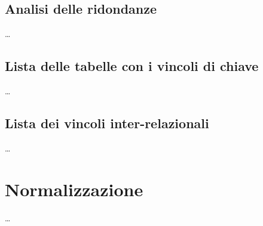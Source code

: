 \documentclass{article}
\begin{document}
\subsection{Analisi delle ridondanze}
\large
\dots

\subsection{Lista delle tabelle con i vincoli di chiave}
\large
\dots

\subsection{Lista dei vincoli inter-relazionali}
\large
\dots

\section{Normalizzazione}
\large
\dots
\end{document}
